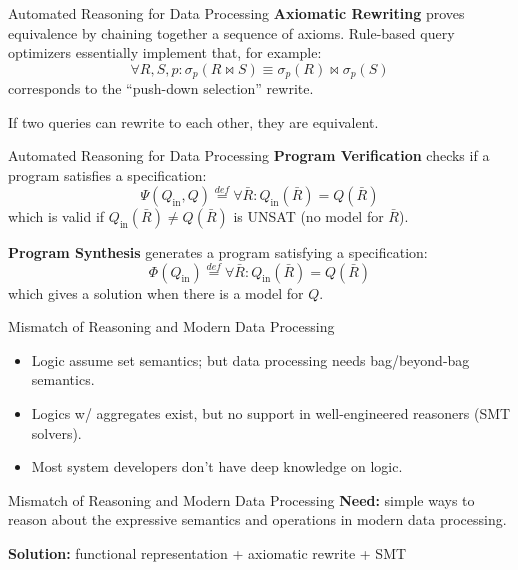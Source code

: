 \documentclass{beamer}
\begin{document}
  \begin{frame}{Automated Reasoning for Data Processing}
    \textbf{Axiomatic Rewriting} proves equivalence by chaining together 
    a sequence of axioms. \pause
    Rule-based query optimizers essentially implement that, for example:
    \[\forall R, S, p: \sigma_p (R\bowtie S) \equiv \sigma_p(R) \bowtie \sigma_p(S)\]
    corresponds to the ``push-down selection'' rewrite.\pause

    If two queries can rewrite to each other, they are equivalent.
  \end{frame}

  \begin{frame}{Automated Reasoning for Data Processing}
    \textbf{Program Verification} checks if a program satisfies a specification:
    \[\Psi(Q_{\text{in}}, Q) \stackrel{def}{=} \forall \bar R : Q_{\text{in}}(\bar R) = Q(\bar R)\]
    which is valid if $Q_{\text{in}}(\bar R) \neq Q(\bar R)$ is UNSAT (no model for $\bar R$). \pause

    \textbf{Program Synthesis} generates a program satisfying a specification:
    \[\Phi(Q_{\text{in}}) \stackrel{def}{=} \forall \bar R : Q_{\text{in}}(\bar R) = Q(\bar R)\]
    which gives a solution when there is a model for $Q$.
  \end{frame}

  \begin{frame}{Mismatch of Reasoning and Modern Data Processing}
    \begin{itemize}
      \item Logic assume set semantics; but data processing needs bag/beyond-bag semantics. \pause
      \item Logics w/ aggregates exist, but no support in well-engineered reasoners (SMT solvers). \pause
      \item Most system developers don't have deep knowledge on logic. 
    \end{itemize}    
  \end{frame}

  \begin{frame}{Mismatch of Reasoning and Modern Data Processing}
    \textbf{Need:} simple ways to reason about the expressive semantics and operations in modern 
    data processing. \pause

    \textbf{Solution:} functional representation + axiomatic rewrite + SMT
  \end{frame}
  
\end{document}
